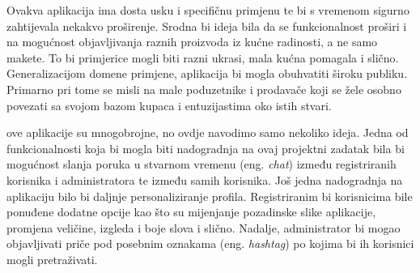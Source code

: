 		Ovakva aplikacija ima dosta usku i specifičnu primjenu te bi s vremenom sigurno zahtijevala nekakvo proširenje. Srodna bi ideja bila da se funkcionalnost proširi i na mogućnost objavljivanja raznih proizvoda iz kućne radinosti, a ne samo makete. To bi primjerice mogli biti razni ukrasi, mala kućna pomagala i slično. Generalizacijom domene primjene, aplikacija bi mogla obuhvatiti široku publiku. Primarno pri tome se misli na male poduzetnike i prodavače koji se žele osobno povezati sa svojom bazom kupaca i entuzijastima oko istih stvari.
		
		 ove aplikacije su mnogobrojne, no ovdje navodimo samo nekoliko ideja. Jedna od funkcionalnosti koja bi mogla biti nadogradnja na ovaj projektni zadatak bila bi mogućnost slanja poruka u stvarnom vremenu (eng. \textit{chat}) između registriranih korisnika i administratora te između samih korisnika. Još jedna nadogradnja na aplikaciju bilo bi daljnje personaliziranje profila. Registriranim bi korisnicima bile ponuđene dodatne opcije kao što su mijenjanje pozadinske slike aplikacije, promjena veličine, izgleda i boje slova i slično. Nadalje, administrator bi mogao objavljivati priče pod posebnim oznakama (eng. \textit{hashtag}) po kojima bi ih korisnici mogli pretraživati.

		\eject
		
	